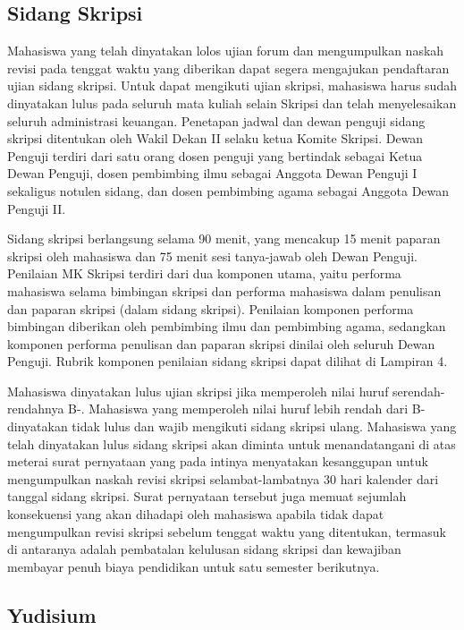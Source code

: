 \documentclass[
  indonesian,
  letterpaper,
]{scrbook}
\begin{document}
\subsection*{Sidang Skripsi}\label{sidang-skripsi}

Mahasiswa yang telah dinyatakan lolos ujian forum dan mengumpulkan
naskah revisi pada tenggat waktu yang diberikan dapat segera mengajukan
pendaftaran ujian sidang skripsi. Untuk dapat mengikuti ujian skripsi,
mahasiswa harus sudah dinyatakan lulus pada seluruh mata kuliah selain
Skripsi dan telah menyelesaikan seluruh administrasi keuangan. Penetapan
jadwal dan dewan penguji sidang skripsi ditentukan oleh Wakil Dekan II
selaku ketua Komite Skripsi. Dewan Penguji terdiri dari satu orang dosen
penguji yang bertindak sebagai Ketua Dewan Penguji, dosen pembimbing
ilmu sebagai Anggota Dewan Penguji I sekaligus notulen sidang, dan dosen
pembimbing agama sebagai Anggota Dewan Penguji II.

Sidang skripsi berlangsung selama 90 menit, yang mencakup 15 menit
paparan skripsi oleh mahasiswa dan 75 menit sesi tanya-jawab oleh Dewan
Penguji. Penilaian MK Skripsi terdiri dari dua komponen utama, yaitu
performa mahasiswa selama bimbingan skripsi dan performa mahasiswa dalam
penulisan dan paparan skripsi (dalam sidang skripsi). Penilaian komponen
performa bimbingan diberikan oleh pembimbing ilmu dan pembimbing agama,
sedangkan komponen performa penulisan dan paparan skripsi dinilai oleh
seluruh Dewan Penguji. Rubrik komponen penilaian sidang skripsi dapat
dilihat di Lampiran 4.

Mahasiswa dinyatakan lulus ujian skripsi jika memperoleh nilai huruf
serendah-rendahnya B-. Mahasiswa yang memperoleh nilai huruf lebih
rendah dari B- dinyatakan tidak lulus dan wajib mengikuti sidang skripsi
ulang. Mahasiswa yang telah dinyatakan lulus sidang skripsi akan diminta
untuk menandatangani di atas meterai surat pernyataan yang pada intinya
menyatakan kesanggupan untuk mengumpulkan naskah revisi skripsi
selambat-lambatnya 30 hari kalender dari tanggal sidang skripsi. Surat
pernyataan tersebut juga memuat sejumlah konsekuensi yang akan dihadapi
oleh mahasiswa apabila tidak dapat mengumpulkan revisi skripsi sebelum
tenggat waktu yang ditentukan, termasuk di antaranya adalah pembatalan
kelulusan sidang skripsi dan kewajiban membayar penuh biaya pendidikan
untuk satu semester berikutnya.

\subsection*{Yudisium}\label{yudisium}
\end{document}
